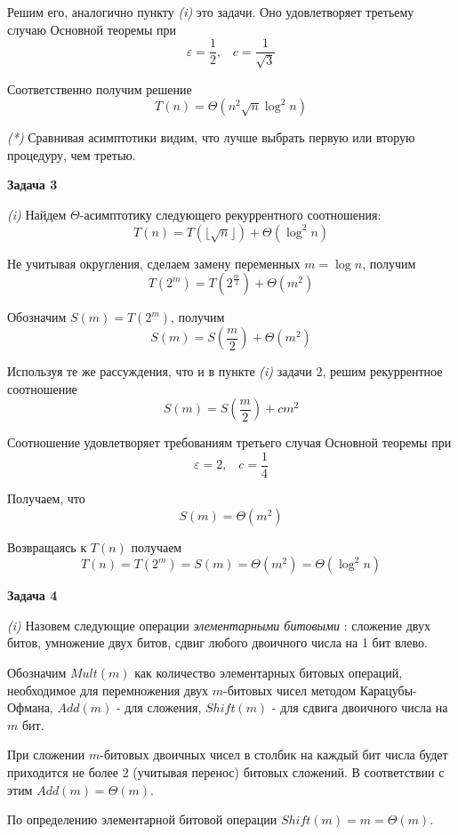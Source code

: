 \documentclass[10pt]{article}
\let \eps \varepsilon
\begin{document}
Решим его, аналогично пункту {\it (i)} это задачи. Оно удовлетворяет третьему случаю Основной теоремы при
$$
  \eps = \frac{1}{2}, \;\;\; c = \frac{1}{\sqrt{3}}
$$

Соответственно получим решение
$$
  T(n) = \Theta(n^2 \sqrt{n} \log^2{n})
$$

\smallskip

{\it (*)}
Сравнивая асимптотики видим, что лучше выбрать первую или вторую процедуру, чем третью.

\medskip

{\bf Задача 3}

{\it (i)}
Найдем $\Theta$-асимптотику следующего рекуррентного соотношения:
$$
  T(n) = T(\lfloor \sqrt{n} \rfloor) + \Theta(\log^2{n})
$$

Не учитывая округления, сделаем замену переменных $m = \log {n}$, получим
$$
  T(2^m) = T(2^{\frac{m}{2}}) + \Theta(m^2)
$$

Обозначим $S(m) = T(2^{m})$, получим
$$
  S(m) = S\left(\frac{m}{2}\right) + \Theta(m^2)
$$

Используя те же рассуждения, что и в пункте {\it (i)} задачи 2, решим рекуррентное соотношение
$$
  S(m) = S\left(\frac{m}{2}\right) + c m^2
$$

Соотношение удовлетворяет требованиям третьего случая Основной теоремы при
$$
  \eps = 2, \;\;\; c = \frac{1}{4}
$$

Получаем, что
$$
  S(m) = \Theta(m^2)
$$

Возвращаясь к $T(n)$ получаем
$$
  T(n) = T(2^m) = S(m) = \Theta(m^2) = \Theta(\log^2{n})
$$

\medskip

{\bf Задача 4}

{\it (i)}
Назовем следующие операции {\it элементарными битовыми }: сложение двух битов, умножение двух битов, сдвиг любого двоичного числа на 1 бит влево. 

Обозначим $Mult(m)$ как количество элементарных битовых операций, необходимое для перемножения двух $m$-битовых чисел методом Карацубы-Офмана, $Add(m)$ - для сложения, $Shift(m)$ - для сдвига двоичного числа на $m$ бит.

При сложении $m$-битовых двоичных чисел в столбик на каждый бит числа будет приходится не более 2 (учитывая перенос) битовых сложений.
В соответствии с этим $Add(m) = \Theta(m)$.

По определению элементарной битовой операции $Shift(m) = m = \Theta(m)$.

\smallskip
\end{document}
